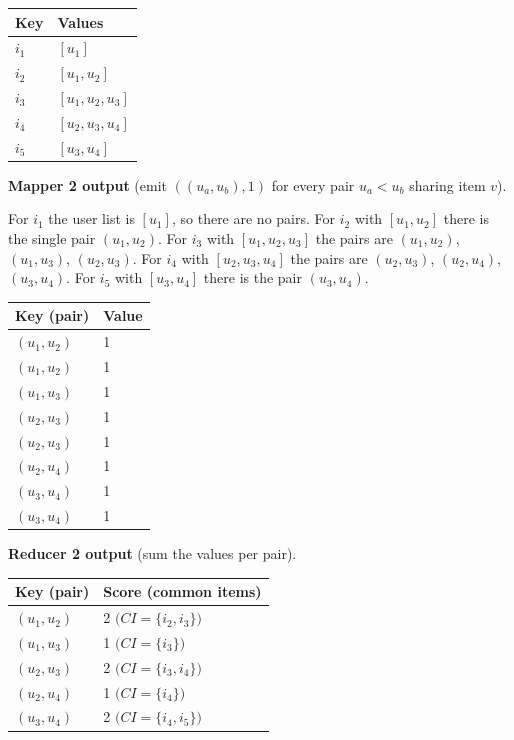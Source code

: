 \documentclass[a4paper,11pt]{article}
\begin{document}
\begin{center}
\begin{tabular}{ll}
\toprule
\textbf{Key} & \textbf{Values} \\
\midrule
$i_1$ & $[u_1]$ \\
$i_2$ & $[u_1, u_2]$ \\
$i_3$ & $[u_1, u_2, u_3]$ \\
$i_4$ & $[u_2, u_3, u_4]$ \\
$i_5$ & $[u_3, u_4]$ \\
\bottomrule
\end{tabular}
\end{center}

\medskip

\textbf{Mapper 2 output} (emit $((u_a, u_b), 1)$ for every pair $u_a < u_b$ sharing item $v$).

For $i_1$ the user list is $[u_1]$, so there are no pairs. For $i_2$ with $[u_1, u_2]$ there is the single pair $(u_1, u_2)$. For $i_3$ with $[u_1, u_2, u_3]$ the pairs are $(u_1,u_2)$, $(u_1,u_3)$, $(u_2,u_3)$. For $i_4$ with $[u_2, u_3, u_4]$ the pairs are $(u_2,u_3)$, $(u_2,u_4)$, $(u_3,u_4)$. For $i_5$ with $[u_3, u_4]$ there is the pair $(u_3, u_4)$.

\begin{center}
\begin{tabular}{ll}
\toprule
\textbf{Key (pair)} & \textbf{Value} \\
\midrule
$(u_1, u_2)$ & 1 \\
$(u_1, u_2)$ & 1 \\
$(u_1, u_3)$ & 1 \\
$(u_2, u_3)$ & 1 \\
$(u_2, u_3)$ & 1 \\
$(u_2, u_4)$ & 1 \\
$(u_3, u_4)$ & 1 \\
$(u_3, u_4)$ & 1 \\
\bottomrule
\end{tabular}
\end{center}

\medskip

\textbf{Reducer 2 output} (sum the values per pair).

\begin{center}
\begin{tabular}{ll}
\toprule
\textbf{Key (pair)} & \textbf{Score (common items)} \\
\midrule
$(u_1, u_2)$ & 2 \quad $\bigl(CI = \{i_2, i_3\}\bigr)$ \\
$(u_1, u_3)$ & 1 \quad $\bigl(CI = \{i_3\}\bigr)$ \\
$(u_2, u_3)$ & 2 \quad $\bigl(CI = \{i_3, i_4\}\bigr)$ \\
$(u_2, u_4)$ & 1 \quad $\bigl(CI = \{i_4\}\bigr)$ \\
$(u_3, u_4)$ & 2 \quad $\bigl(CI = \{i_4, i_5\}\bigr)$ \\
\bottomrule
\end{tabular}
\end{center}
\end{document}
